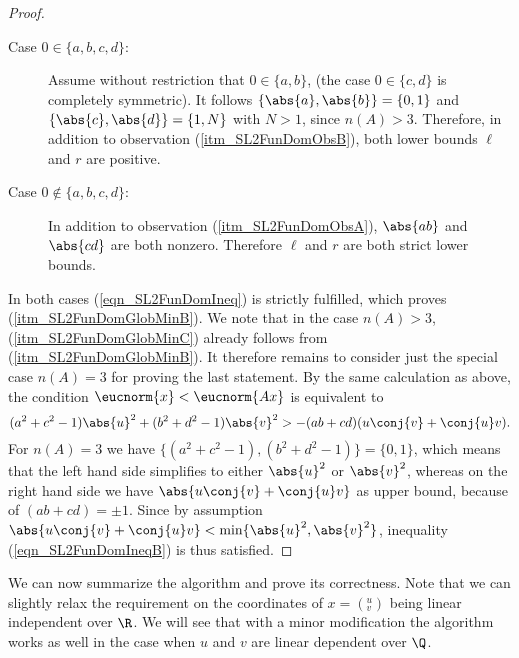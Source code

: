 \begin{proof}
\begin{description}
\item[Case $0 \in \{a,b,c,d\}$:] Assume without restriction that $0 \in \{a,b\}$, (the case $0 \in \{c,d\}$ is completely symmetric). It follows $\{\abs{a},\abs{b}\} = \{0,1\}$ and $\{\abs{c},\abs{d}\} = \{1,N\}$ with $N > 1$, since $n(A) > 3$. Therefore, in addition to observation (\ref{itm_SL2FunDomObsB}), both lower bounds $\ell$ and $r$ are positive. 
\item[Case $0 \notin \{a,b,c,d\}$:] In addition to observation (\ref{itm_SL2FunDomObsA}), $\abs{ab}$ and $\abs{cd}$ are both nonzero. Therefore $\ell$ and $r$ are both strict lower bounds.
\end{description}
In both cases (\ref{eqn_SL2FunDomIneq}) is strictly fulfilled, which proves (\ref{itm_SL2FunDomGlobMinB}). We note that in the case $n(A) > 3$, (\ref{itm_SL2FunDomGlobMinC}) already follows from (\ref{itm_SL2FunDomGlobMinB}). It therefore remains to consider just the special case $n(A) = 3$ for proving the last statement. By the same calculation as above, the condition $\eucnorm{x} < \eucnorm{Ax}$ is equivalent to
\begin{equation}
\label{eqn_SL2FunDomIneqB}
(a^2 + c^2 - 1)\abs{u}^2 + (b^2 + d^2 - 1)\abs{v}^2 > -(ab + cd)(u\conj{v} + \conj{u}v).
\end{equation}
For $n(A) = 3$ we have $\{(a^2 + c^2 - 1),(b^2 + d^2 - 1)\} = \{0,1\}$, which means that the left hand side simplifies to either $\abs{u}^2$ or $\abs{v}^2$, whereas on the right hand side we have $\abs{u\conj{v} + \conj{u}v}$ as upper bound, because of $(ab + cd) = \pm 1$. Since by assumption $\abs{u\conj{v} + \conj{u}v} < \min\{\abs{u}^2,\abs{v}^2\}$, inequality (\ref{eqn_SL2FunDomIneqB}) is thus satisfied.
\end{proof}

We can now summarize the algorithm and prove its correctness. Note that we can slightly relax the requirement on the coordinates of $x = ({}^u_v)$ being linear independent over $\R$. We will see that with a minor modification the algorithm works as well in the case when $u$ and $v$ are linear dependent over $\Q$.

